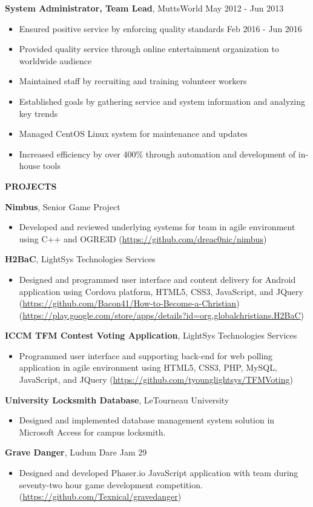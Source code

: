 \documentclass[letterpaper]{article}
\newcommand{\altsection}[1]{\noindent\textbf{#1}\smallskip}
\newcommand{\entry}[3]{\textbf{#1}, #2\begin{itemize}[leftmargin=3.5em]#3\end{itemize}\bigskip}
\begin{document}
\entry{System Administrator, Team Lead}{MuttsWorld                             \hfill          May 2012 - Jun 2013}  {
    \item Ensured positive service by enforcing quality standards       \hfill          Feb 2016 - Jun 2016
    \item Provided quality service through online entertainment organization to worldwide audience
    \item Maintained staff by recruiting and training volunteer workers
    \item Established goals by gathering service and system information and analyzing key trends
    \item Managed CentOS Linux system for maintenance and updates
    \item Increased efficiency by over 400\% through automation and development of in-house tools
}

\altsection{PROJECTS}

\entry{Nimbus}{Senior Game Project} {
    \item Developed and reviewed underlying systems for team in agile environment using C++ and OGRE3D (\url{https://github.com/dreac0nic/nimbus})
}

\entry{H2BaC}{LightSys Technologies Services} {
    \item Designed and programmed user interface and content delivery for Android application using Cordova platform, HTML5, CSS3, JavaScript, and JQuery (\url{https://github.com/Bacon41/How-to-Become-a-Christian}) (\url{https://play.google.com/store/apps/details?id=org.globalchristians.H2BaC})
}

\entry{ICCM TFM Contest Voting Application}{LightSys Technologies Services} {
    \item Programmed user interface and supporting back-end for web polling application in agile environment using HTML5, CSS3, PHP, MySQL, JavaScript, and JQuery (\url{https://github.com/tyounglightsys/TFMVoting})
}

\entry{University Locksmith Database}{LeTourneau University} {
    \item Designed and implemented database management system solution in Microsoft Access for campus locksmith.
}

\entry{Grave Danger}{Ludum Dare Jam 29} {
    \item Designed and developed Phaser.io JavaScript application with team during seventy-two hour game development competition. (\url{https://github.com/Texnical/gravedanger})
}
\end{document}

